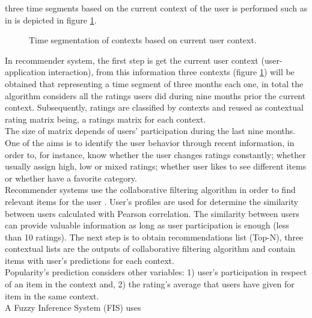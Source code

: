 three time segments based on the current context of the user is
performed such as in is depicted in figure \ref{fig:context-ml}.
\begin{figure}
\captionsetup{justification=centering,margin=2cm,font=footnotesize}
\centering
\setlength\fboxsep{0pt}
\caption{Time segmentation of contexts based on current user
context.}
\label{fig:context-ml}     
\end{figure}
In recommender system, the first step is get the current user context
(user-application interaction), from this information three contexts
(figure \ref{fig:context-ml})  will be obtained that representing a
time segment of three months each one, in total the algorithm
considers all the ratings users did during nine months prior the
current context. Subsequently, ratings are classified by contexts and
reused as contextual rating matrix being, a ratings matrix for each
context. \\The size of matrix depends of users' participation during
the last nine months. One of the aims is to identify the user behavior
through recent information, in order to, for instance, know whether
the user changes ratings constantly; whether usually assign high, low
or mixed ratings; whether user likes to see different items or whether
have a favorite category.\\  Recommender systems use the collaborative
filtering algorithm in order to find relevant items for the user
\cite{ramirez2013restaurant}. User's profiles are used for determine
the similarity between users calculated with Pearson correlation. The
similarity between users can provide valuable information as long as
user participation is enough (less than 10 ratings). The next step is
to obtain recommendations list (Top-N), three contextual lists are the
outputs of collaborative filtering algorithm and contain items with
user's predictions for each context.\\  Popularity's prediction
considers other variables: 1) user’s participation in respect of an
item in the context and, 2) the rating's average that users have given
for item in the same context. \\   A Fuzzy Inference System (FIS) uses
